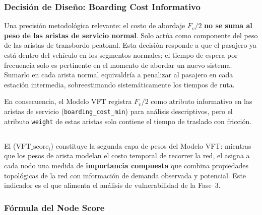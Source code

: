 \subsubsection{Decisión de Diseño: Boarding Cost Informativo}
\label{subsubsec:boarding-cost-diseno}

Una precisión metodológica relevante: el costo de abordaje $F_v / 2$ \textbf{no
se suma al peso de las aristas de servicio normal}. Solo actúa como componente
del peso de las aristas de transbordo peatonal. Esta decisión responde a que el
pasajero ya está dentro del vehículo en los segmentos normales; el tiempo de
espera por frecuencia solo es pertinente en el momento de abordar un nuevo
sistema. Sumarlo en cada arista normal equivaldría a penalizar al pasajero en
cada estación intermedia, sobreestimando sistemáticamente los tiempos de ruta.

En consecuencia, el Modelo VFT registra $F_v / 2$ como atributo informativo
en las aristas de servicio (\texttt{boarding\_cost\_min}) para análisis
descriptivos, pero el atributo \texttt{weight} de estas aristas solo contiene
el tiempo de traslado con fricción.

\subsection{}
\label{subsec:node-score}


El  ($\text{VFT\_score}_i$) constituye la segunda capa de
pesos del Modelo VFT: mientras que los pesos de arista modelan el costo temporal
de recorrer la red, el  asigna a cada nodo una medida de
\textbf{importancia compuesta} que combina propiedades topológicas de la red con
información de demanda observada y potencial. Este indicador es el que alimenta
el análisis de vulnerabilidad de la Fase~3.

\subsubsection{Fórmula del Node Score}
\label{subsubsec:formula-vft-score}

